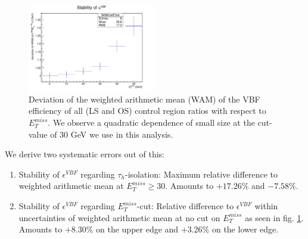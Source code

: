 \begin{figure}[!h]
	\centering
	\includegraphics[width=0.5\textwidth]{PLOTS/diTauHadLSQCDPlots/stability/Stability.pdf}
	\caption{\label{dihad:fig:Stability}Deviation of the weighted arithmetic mean (WAM) of the VBF efficiency of all (LS and OS) control region ratios with respect to $E_{T}^{miss}$. We observe a quadratic dependence of small size at the cut-value of 30 GeV we use in this analysis.}
\end{figure}

We derive two systematic errors out of this:
\begin{enumerate}
	\item Stability of $\epsilon^{VBF}$ regarding $\tau_{h}$-isolation: Maximum relative difference to weighted arithmetic mean at $E_{T}^{miss}\geq30$. Amounts to $+17.26\%$ and $-7.58\%$.
	\item Stability of $\epsilon^{VBF}$ regarding $E_{T}^{miss}$-cut: Relative difference to $\epsilon^{VBF}$ within uncertainties of weighted arithmetic
	mean at no cut on $E_{T}^{miss}$ as seen in fig. \ref{dihad:fig:Stability}. Amounts to $+8.30\%$ on the upper edge and $+3.26\%$ on the lower edge.
\end{enumerate}

\clearpage



